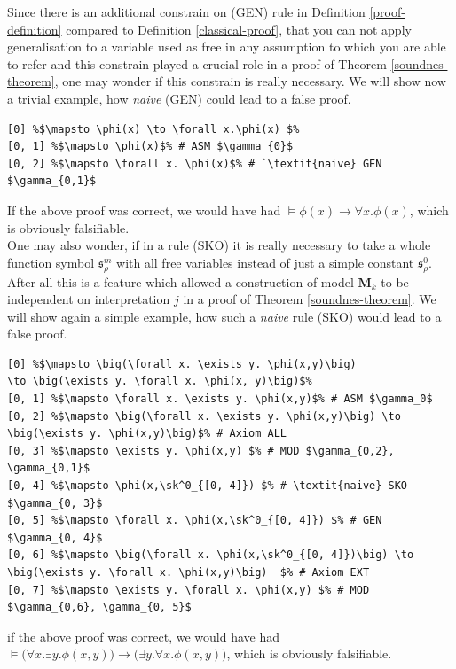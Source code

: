 \documentclass[10pt]{article}
\theoremstyle{plain}
\newcommand{\sk}{\mathfrak{s}}
\newcommand{\M}{\mathbf{M}}
\begin{document}
Since there is an additional constrain on (GEN) rule in Definition \ref{proof-definition} compared to Definition \ref{classical-proof}, that you can not apply generalisation to a variable used as free in any assumption to which you are able to refer and this constrain played a crucial role in a proof of Theorem \ref{soundnes-theorem}, one may wonder if this constrain is really necessary. We will show now a trivial example, how \textit{naive} (GEN) could lead to a false proof.

\begin{lstlisting}[texcl, escapechar=\%]
[0] %$\mapsto \phi(x) \to \forall x.\phi(x) $%
[0, 1] %$\mapsto \phi(x)$% # ASM $\gamma_{0}$
[0, 2] %$\mapsto \forall x. \phi(x)$% # `\textit{naive} GEN $\gamma_{0,1}$
\end{lstlisting}

If the above proof was correct, we would have had $\models \phi(x) \to \forall x.\phi(x)$, which is obviously falsifiable.
\\

One may also wonder, if in a rule (SKO) it is really necessary to take a whole function symbol $\sk^m_\rho$ with all free variables instead of just a simple constant $\sk^0_\rho$. After all this is a feature which allowed a construction of model $\M_k$ to be independent on interpretation $j$ in a proof of Theorem \ref{soundnes-theorem}.
We will show again a simple example, how such a \textit{naive} rule (SKO) would lead to a false proof.

\begin{lstlisting}[texcl, escapechar=\%]
[0] %$\mapsto \big(\forall x. \exists y. \phi(x,y)\big) 
\to \big(\exists y. \forall x. \phi(x, y)\big)$% 
[0, 1] %$\mapsto \forall x. \exists y. \phi(x,y)$% # ASM $\gamma_0$
[0, 2] %$\mapsto \big(\forall x. \exists y. \phi(x,y)\big) \to \big(\exists y. \phi(x,y)\big)$% # Axiom ALL
[0, 3] %$\mapsto \exists y. \phi(x,y) $% # MOD $\gamma_{0,2}, \gamma_{0,1}$
[0, 4] %$\mapsto \phi(x,\sk^0_{[0, 4]}) $% # \textit{naive} SKO $\gamma_{0, 3}$
[0, 5] %$\mapsto \forall x. \phi(x,\sk^0_{[0, 4]}) $% # GEN $\gamma_{0, 4}$
[0, 6] %$\mapsto \big(\forall x. \phi(x,\sk^0_{[0, 4]})\big) \to \big(\exists y. \forall x. \phi(x,y)\big)  $% # Axiom EXT
[0, 7] %$\mapsto \exists y. \forall x. \phi(x,y) $% # MOD $\gamma_{0,6}, \gamma_{0, 5}$
\end{lstlisting}

if the above proof was correct, we would have had\\
$\models \big(\forall x. \exists y. \phi(x,y)\big) 
\to \big(\exists y. \forall x. \phi(x, y)\big)$, which is obviously falsifiable.
\end{document}
